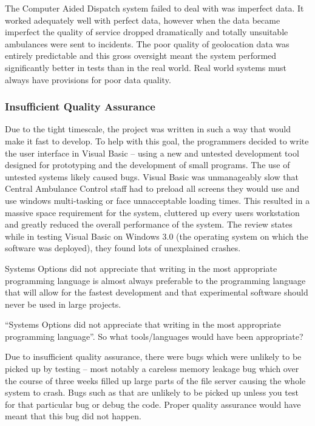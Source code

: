 \documentclass[10pt,\jkfside,a4paper]{article}
\begin{document}
\begin{enumerate}
\begin{enumerate}
\begin{enumerate}[label=(\roman*)]
The Computer Aided Dispatch system failed to deal with was imperfect data. It worked adequately well 
with perfect data, however when the data became imperfect the quality of service dropped dramatically and 
totally unsuitable ambulances were sent to incidents. The poor quality of geolocation data was 
entirely predictable and this gross oversight meant the system performed significantly better in tests 
than in the real world. Real world systems must always have provisions for poor data quality.

\subsubsection*{Insufficient Quality Assurance}

Due to the tight timescale, the project was written in such a way that would make it fast to develop. 
To help with this goal, the programmers decided to write the user interface in Visual Basic -- using a 
new and untested development tool designed for prototyping and the development of small programs. The 
use of untested systems likely caused bugs. Visual Basic was unmanageably slow that Central Ambulance Control 
staff had to preload all screens they would use and use windows multi-tasking or face unnacceptable 
loading times. This resulted in a massive space requirement for the system, cluttered up every users workstation 
and greatly reduced the overall performance of the system. The review states while in testing Visual Basic 
on Windows 3.0 (the operating system on which the software was deployed), they found lots of unexplained 
crashes.

Systems Options did not appreciate that writing in the most appropriate programming language is almost 
always preferable to the programming language that will allow for the fastest development and that 
experimental software should never be used in large projects.

{\color{blue} ``Systems Options did not appreciate that writing in the most appropriate programming language''.
So what tools/languages would have been appropriate?}

Due to insufficient quality assurance, there were bugs which were unlikely to be picked up by testing -- most 
notably a careless memory leakage bug which over the course of three weeks filled up large parts of the 
file server causing the whole system to crash. Bugs such as that are unlikely to be picked up unless 
you test for that particular bug or debug the code. Proper quality assurance would have meant that 
this bug did not happen.


\end{enumerate}
\end{enumerate}
\end{enumerate}
\end{document}
